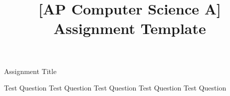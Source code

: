 \documentclass[11pt]{exam}
\title{[AP Computer Science A] Assignment Template}
\newcommand{\AssignmentTitle}{Assignment Title}
\newcommand{\ColorQuestion}[2]{\renewcommand{\questionlabel}{\colorbox{#1}{\color{white}\thequestion}\hfill}\question #2}
\newcommand{\BlueQuestion}[1]{\ColorQuestion{RoyalBlue}{#1}}
\newcommand{\GreenQuestion}[1]{\ColorQuestion{ForestGreen}{#1}}
\newcommand{\YellowQuestion}[1]{\ColorQuestion{Goldenrod}{#1}}
\newcommand{\RedQuestion}[1]{\ColorQuestion{BrickRed}{#1}}
\newcommand{\PurpleQuestion}[1]{\ColorQuestion{RoyalPurple}{#1}}
\begin{document}
	\begin{center}
		\Large\AssignmentTitle
	\end{center}

	\begin{questions}
		\BlueQuestion{Test Question}
		\GreenQuestion{Test Question}
		\YellowQuestion{Test Question}
		\RedQuestion{Test Question}
		\PurpleQuestion{Test Question}
	\end{questions}
\end{document}
